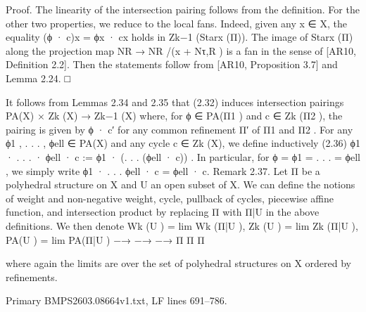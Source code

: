 \documentclass[
  11pt,
]{article}
\newenvironment{Shaded}{}{}
\newcommand{\NormalTok}[1]{#1}
\begin{document}
\begin{Shaded}
\begin{Highlighting}[]
\NormalTok{Proof. The linearity of the intersection pairing follows from the definition. For the other two}
\NormalTok{properties, we reduce to the local fans. Indeed, given any x ∈ X, the equality (ϕ · c)x = ϕx · cx}
\NormalTok{holds in Zk−1 (Starx (Π)). The image of Starx (Π) along the projection map NR → NR /(x + Nτ,R ) is}
\NormalTok{a fan in the sense of [AR10, Definition 2.2]. Then the statements follow from [AR10, Proposition}
\NormalTok{3.7] and Lemma 2.24.                                                                            □}

\NormalTok{   It follows from Lemmas 2.34 and 2.35 that (2.32) induces intersection pairings}
\NormalTok{                                               PA(X) × Zk (X) → Zk−1 (X)}
\NormalTok{where, for ϕ ∈ PA(Π1 ) and c ∈ Zk (Π2 ), the pairing is given by ϕ · c′ for any common refinement Π′}
\NormalTok{of Π1 and Π2 . For any ϕ1 , . . . , ϕell ∈ PA(X) and any cycle c ∈ Zk (X), we define inductively}
\NormalTok{(2.36)                                      ϕ1 · . . . · ϕell · c := ϕ1 · (. . . (ϕell · c)) .}
\NormalTok{In particular, for ϕ = ϕ1 = . . . = ϕell , we simply write ϕ1 · . . . ϕell · c = ϕell · c.}
\NormalTok{Remark 2.37. Let Π be a polyhedral structure on X and U an open subset of X. We can define}
\NormalTok{the notions of weight and non{-}negative weight, cycle, pullback of cycles, piecewise affine function,}
\NormalTok{and intersection product by replacing Π with Π|U in the above definitions. We then denote}
\NormalTok{               Wk (U ) = lim Wk (Π|U ),             Zk (U ) = lim Zk (Π|U ),           PA(U ) = lim PA(Π|U )}
\NormalTok{                         −→                                   −→                                −→}
\NormalTok{                               Π                                  Π                               Π}

\NormalTok{where again the limits are over the set of polyhedral structures on X ordered by refinements.}
\end{Highlighting}
\end{Shaded}

Primary BMPS2603.08664v1.txt, LF lines 691--786.
\end{document}
